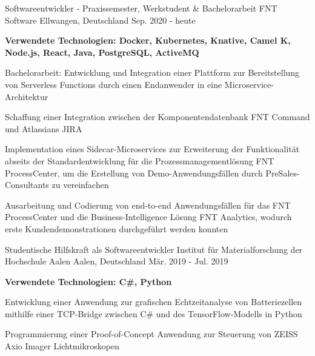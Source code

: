 

\begin{cventries}

\cventry
  {Softwareentwickler - Praxissemester, Werkstudent \& Bachelorarbeit} %
  {\faBuilding{} FNT Software} %
  {Ellwangen, Deutschland} %
  {Sep. 2020 - heute} %
  {
    \begin{cvitems} %
      {\scriptsize\textbf{Verwendete Technologien: Docker, Kubernetes, Knative, Camel K, Node.js, React, Java, PostgreSQL, ActiveMQ}}
      \item {}
      \item {Bachelorarbeit: Entwicklung und Integration einer Plattform zur Bereitstellung von Serverless Functions durch einen Endanwender in eine Microservice-Architektur}
      \item {Schaffung einer Integration zwischen der Komponentendatenbank FNT Command und Atlassians JIRA}
      \item {Implementation eines Sidecar-Microservices zur Erweiterung der Funktionalität abseits der Standardentwicklung für die Prozessmanagementlösung FNT ProcessCenter, um die Erstellung von Demo-Anwendungsfällen durch PreSales-Consultants zu vereinfachen}
      \item {Ausarbeitung und Codierung von end-to-end Anwendungsfällen für das FNT ProcessCenter und die Business-Intelligence Lösung FNT Analytics, wodurch erste Kundendemonstrationen durchgeführt werden konnten}
    \end{cvitems} 
  }

  \cventry
    {Studentische Hilfskraft als Softwareentwickler} %
    {\faFlask{} Institut für Materialforschung der Hochschule Aalen} %
    {Aalen, Deutschland} %
    {Mär. 2019 - Jul. 2019} %
    {
      \begin{cvitems} %
        {\scriptsize\textbf{Verwendete Technologien: C\#, Python}}
        \item {}
        \item {Entwicklung einer Anwendung zur grafischen Echtzeitanalyse von Batteriezellen mithilfe einer TCP-Bridge zwischen C\# und des TensorFlow-Modells in Python}
        \item {Programmierung einer Proof-of-Concept Anwendung zur Steuerung von ZEISS Axio Imager Lichtmikroskopen}
      \end{cvitems}
    }


\end{cventries}
